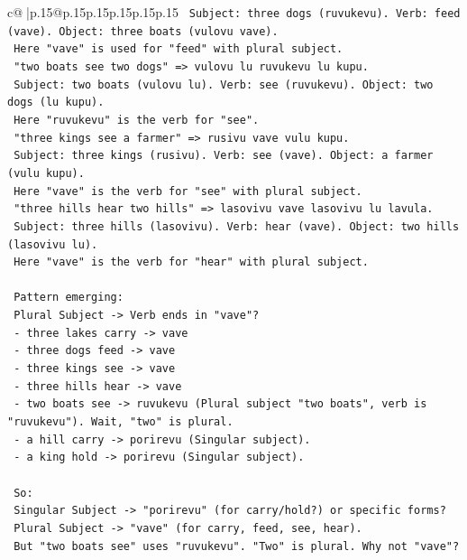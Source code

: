 \documentclass{article}
\begin{document}
{\begin{supertabular}{c@{$\;$}|p{.15\linewidth}@{}p{.15\linewidth}p{.15\linewidth}p{.15\linewidth}p{.15\linewidth}p{.15\linewidth}}
{{{\texttt{   Subject: three dogs (ruvukevu). Verb: feed (vave). Object: three boats (vulovu vave).} \\
\texttt{   Here "vave" is used for "feed" with plural subject.} \\
\texttt{   "two boats see two dogs" => vulovu lu ruvukevu lu kupu.} \\
\texttt{   Subject: two boats (vulovu lu). Verb: see (ruvukevu). Object: two dogs (lu kupu).} \\
\texttt{   Here "ruvukevu" is the verb for "see".} \\
\texttt{   "three kings see a farmer" => rusivu vave vulu kupu.} \\
\texttt{   Subject: three kings (rusivu). Verb: see (vave). Object: a farmer (vulu kupu).} \\
\texttt{   Here "vave" is the verb for "see" with plural subject.} \\
\texttt{   "three hills hear two hills" => lasovivu vave lasovivu lu lavula.} \\
\texttt{   Subject: three hills (lasovivu). Verb: hear (vave). Object: two hills (lasovivu lu).} \\
\texttt{   Here "vave" is the verb for "hear" with plural subject.} \\
\\ 
\texttt{   Pattern emerging:} \\
\texttt{   Plural Subject {-}> Verb ends in "vave"?} \\
\texttt{   {-} three lakes carry {-}> vave} \\
\texttt{   {-} three dogs feed {-}> vave} \\
\texttt{   {-} three kings see {-}> vave} \\
\texttt{   {-} three hills hear {-}> vave} \\
\texttt{   {-} two boats see {-}> ruvukevu (Plural subject "two boats", verb is "ruvukevu"). Wait, "two" is plural.} \\
\texttt{   {-} a hill carry {-}> porirevu (Singular subject).} \\
\texttt{   {-} a king hold {-}> porirevu (Singular subject).} \\
\\ 
\texttt{   So:} \\
\texttt{   Singular Subject {-}> "porirevu" (for carry/hold?) or specific forms?} \\
\texttt{   Plural Subject {-}> "vave" (for carry, feed, see, hear).} \\
\texttt{   But "two boats see" uses "ruvukevu". "Two" is plural. Why not "vave"?} \\
}}}
\end{supertabular}}
\end{document}
